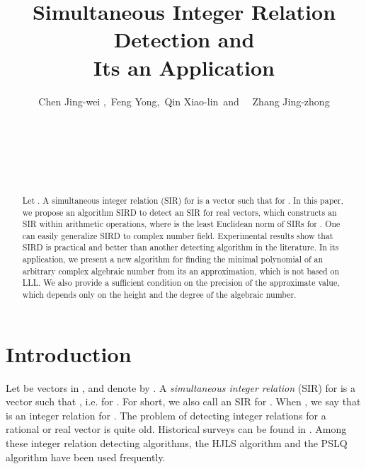 \documentclass{sig-alternate}
\numberwithin{theorem}{section} \numberwithin{equation}{section}
\begin{document}
\title{ Simultaneous Integer Relation Detection and\\
Its an Application}

\author{
\alignauthor Chen Jing-wei ,\ Feng
Yong,\ Qin
Xiao-lin\
and \ \ Zhang Jing-zhong\\
       \affaddr{\ }\\
       \\
       \\
       \\
       \\
} \maketitle

\begin{abstract}
Let . A
simultaneous integer relation (SIR) for  is a vector  such that
 for . In this
paper, we propose an algorithm SIRD to detect an SIR for real
vectors, which constructs an SIR within  arithmetic operations, where  is the least
Euclidean norm of SIRs for . One
can easily generalize SIRD to complex number field. Experimental
results show that SIRD is practical and better than another
detecting algorithm in the literature. In its application, we
present a new algorithm for finding the minimal polynomial of an
arbitrary complex algebraic number from its an approximation, which
is not based on LLL. We also provide a sufficient condition on the
precision of the approximate value, which depends only on the height
and the degree of  the
algebraic number.\end{abstract}



\section{Introduction}
\label{sec:introduction}

Let
  be vectors in ,
and denote  by . A
\emph{simultaneous integer relation} (SIR) for  is a vector  such that , i.e.  for . For short, we also call   an SIR for . When , we say that  is an integer relation for
.
The problem of detecting integer relations for a rational or real vector is quite old.
Historical surveys can be found in \cite{Ber1971, FF1979,
Bre1982, HJL1989, FBA1999}. Among these integer relation detecting
algorithms, the HJLS algorithm \cite{HHL1986, HJL1989} and the PSLQ
algorithm \cite{FB1992, FBA1999} have been used frequently.
\end{document}
